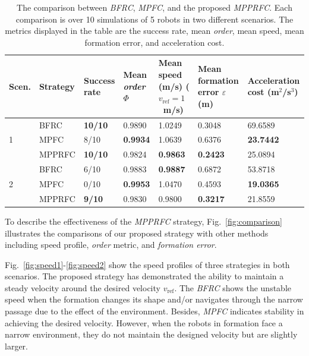 \begin{table}
\centering
\caption{The comparison between \textit{BFRC}, \textit{MPFC}, and the proposed \textit{MPPRFC}. Each comparison is over 10 simulations of 5 robots in two
different scenarios. The metrics displayed in the table are
the success rate, mean \textit{order}, mean speed, mean formation error, and acceleration cost.}
\label{tbl:analys}
\begin{tabular}{C{0.6cm}C{1.2cm}C{1.8cm}C{1.8cm}C{2.5cm}C{2.3cm}C{1.8cm}}
\hline \hline
Scen.             & Strategy & Success rate  & Mean \textit{order} $\Phi$ & Mean speed (m/s) ($v_\text{ref}=1$~m/s) & Mean formation error $\varepsilon$ (m) & Acceleration cost (m$^2$/s$^3$) \\ \hline
{} & BFRC      & \textbf{10/10} & 0.9890     & 1.0249     & 0.3048               & 69.6589    \\
                     & MPFC     & 8/10  & \textbf{0.9934}     & 1.0639     & 0.6376               & \textbf{23.7442}    \\
                     & MPPRFC    & \textbf{10/10} & 0.9824     & \textbf{0.9863}     & \textbf{0.2423}               & 25.0894    \\ \hline
{}   & BFRC      & 6/10  & 0.9883     & \textbf{0.9887}     & 0.6872               & 53.8718    \\
                     & MPFC     & 0/10  & \textbf{0.9953}     & 1.0470      & 0.4593               & \textbf{19.0365}    \\
                     & MPPRFC    & \textbf{9/10}  & 0.9830     & 0.9800       & \textbf{0.3217}               & 21.8559   \\ \hline \hline
\end{tabular}
\end{table}

To describe the effectiveness of the \textit{MPPRFC} strategy, Fig.~\ref{fig:comparison} illustrates the comparisons of our proposed strategy with other methods including speed profile, \textit{order} metric, and \textit{formation error}. 

Fig.~\ref{fig:speed1}-\ref{fig:speed2} show the speed profiles of three strategies in both scenarios. The proposed strategy has demonstrated the ability to maintain a steady velocity around the desired velocity $v_\text{ref}$. The \textit{BFRC} shows the unstable speed when the formation changes its shape and/or navigates through the narrow passage due to the effect of the environment. Besides, \textit{MPFC} indicates stability in achieving the desired velocity. However, when the robots in formation face a narrow environment, they do not maintain the designed velocity but are slightly larger.

